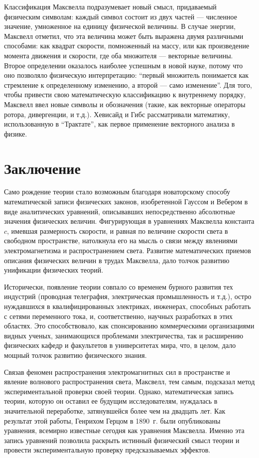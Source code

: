 \documentclass[12pt, oneside, a4paper]{article}
\begin{document}
Классификация Максвелла подразумевает новый смысл, придаваемый физическим символам: каждый символ состоит из двух частей --- численное значение, умноженное на единицу физической величины. В случае энергии, Максвелл отметил, что эта величина может быть выражена двумя различными способами: как квадрат скорости, помноженный на массу, или как  произведение момента движения и скорости, где оба множителя --- векторные величины. Второе определении оказалось наиболее успешным в новой науке, потому что оно позволяло физическую интерпретацию: ``первый множитель понимается как стремление к определенному изменению, а второй --- само изменение''. Для того, чтобы привести свою математическую классификацию к внутреннему порядку, Максвелл ввел новые символы и обозначения (такие, как векторные операторы ротора, дивергенции, и т.д.). Хевисайд и Гибс рассматривали математику, использованную в ``Трактате'', как первое применение векторного анализа в физике.

\section{Заключение}
Само рождение теории стало возможным благодаря новаторскому способу математической записи физических законов, изобретенной Гауссом и Вебером в виде аналитических уравнений, описывавших непосредственно абсолютные значения физических величин. Фигурирующая в уравнениях Максвелла константа $c$, имевшая размерность скорости, и равная по величине скорости света в свободном пространстве, натолкнула его на мысль о связи между явлениями электромагнетизма и распространением света. Развитие математических приемов описания физических величин в трудах Максвелла, дало толчок развитию унификации физических теорий.

Исторически, появление теории совпало со временем  бурного развития тех индустрий (проводная телеграфия, электрическая промышленность и т.д.), остро нуждавшихся в квалифицированных электриках, инженерах, способных работать с сетями переменного тока, и, соответственно, научных разработках в этих областях. Это способствовало, как спонсированию коммерческими организациями видных ученых, занимающихся проблемами электричества, так и расширению  физических кафедр и факультетов в университетах мира, что, в целом, дало мощный толчок развитию физического знания.

Связав феномен распространения электромагнитных сил в пространстве и явление волнового распространения света, Максвелл, тем самым, подсказал метод экспериментальной проверки своей теории. Однако, математическая запись теории, которую он оставил ее будущим исследователям, нуждалась в значительной переработке, затянувшейся более чем на двадцать лет.  Как результат этой работы, Генрихом Герцом в 1890~г. были опубликованы уравнения, всемирно известные сегодня как уравнения Максвелла. Именно эта запись уравнений позволила раскрыть истинный физический смысл теории и провести экспериментальную проверку предсказываемых эффектов. 
\end{document}
